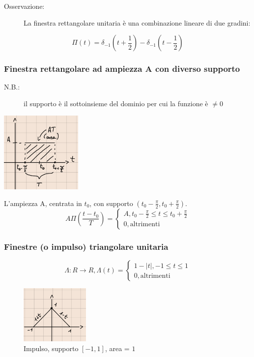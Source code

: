 \documentclass[a4paper, 12pt]{book}
\theoremstyle{plain}
\begin{document}
\begin{description}
    \item[Osservazione: ] La finestra rettangolare unitaria è una combinazione lineare di due gradini: 
\end{description}

\[
    \Pi(t) = \delta_{-1}(t + \frac{1}{2}) - \delta_{-1}(t - \frac{1}{2})
\]

\subsubsection{Finestra rettangolare ad ampiezza A con diverso supporto}

\begin{description}
    \item[N.B.:] il supporto è il sottoinsieme del dominio per cui la funzione è $\neq 0$
\end{description}

\begin{center}
    \includegraphics[width=0.3\textwidth]{finestra2.png}
\end{center}

L'ampiezza A, centrata in $t_0$, con supporto $(t_0 - \frac{\pi}{2}, t_0 + \frac{\pi}{2})$.
\[
    A\Pi(\frac{t - t_0}{T}) = \begin{cases}
        A, t_0 - \frac{\pi}{2} \le t \le t_0 + \frac{\pi}{2}\\
        0, \textrm{altrimenti}
    \end{cases}
\]

\subsubsection{Finestre (o impulso) triangolare unitaria}

\[
    \Lambda : R \rightarrow R, \Lambda(t) = \begin{cases}
        1 - |t|, -1 \le t \le 1\\
        0, \textrm{altrimenti}
    \end{cases}
\]

\begin{figure}
    \includegraphics[width=0.3\textwidth]{triangolo.png}
    \caption{Impulso, supporto $[-1, 1]$, area = $1$}
\end{figure}
\end{document}
